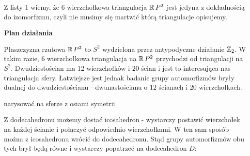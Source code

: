 \documentclass{article}
\begin{document}
Z listy 1 wiemy, że $6$ wierzchołkowa triangulacja $\operatorname{\mathbb{R}} P^2$ jest jedyna z dokładnością do izomorfizmu, czyli nie musimy się martwić którą triangulacje opisujemy.

\textbf{Plan działania}

Płaszczyzna rzutowa $\operatorname{\mathbb{R}} P^2$ to $S^2$ wydzielona przez antypodyczne działanie $\operatorname{\mathbb{Z}}_2$. W takim razie, $6$ wierzchołkowa triangulacja na $\operatorname{\mathbb{R}} P^2$ przychodzi od triangulacji na $S^2$. Dwudziestościan ma $12$ wierzchołków i $20$ ścian i jest to interesująca nas triangulacja sfery. Łatwiejsze jest jednak badanie grupy automorfizmów bryły dualnej do dwudziestościanu - dwunastościanu o $12$ ścianach i $20$ wierzchołkach.

{\large\color{red}narysować na sferze z osiami symetrii}

Z dodecahedronu możemy dostać icosahedron - wystarczy postawić wierzchołek na każdej ścianie i połączyć odpowiednio wierzchołkami. W ten sam sposób można z icosahedronu wrócić do dodecahedronu. Stąd grupy automorfizmów obu tych brył będą równe i wystarczy popatrzeć na dodecahedron $D$:
\end{document}
